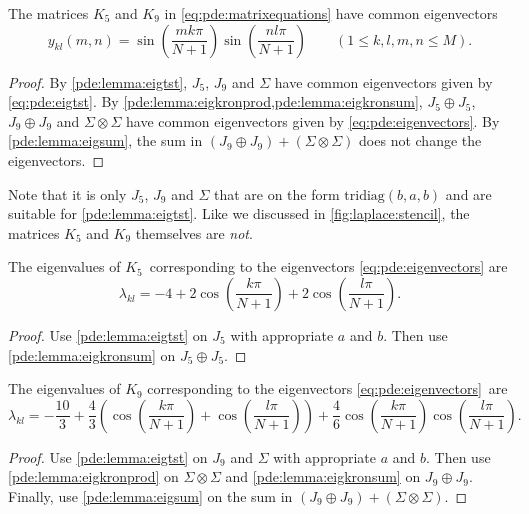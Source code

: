 \newcommand{\eigvecexpr}{\sin \left( \frac{mk\pi}{N+1} \right) \sin \left( \frac{nl\pi}{N+1} \right)}
\begin{theorem}
	The matrices $K_5$ and $K_9$ in \cref{eq:pde:matrixequations} have common eigenvectors
	\begin{equation}
		y_{kl}(m,n)= \eigvecexpr \qquad (1 \leq k,l,m,n \leq M).
		\label{eq:pde:eigenvectors}
	\end{equation}
\end{theorem}
\begin{proof}
	By \cref{pde:lemma:eigtst}, $J_5$, $J_9$ and $\Sigma$ have common eigenvectors given by \cref{eq:pde:eigtst}.
	By \cref{pde:lemma:eigkronprod,pde:lemma:eigkronsum}, $J_5 \oplus J_5$, $J_9 \oplus J_9$ and $\Sigma \otimes \Sigma$ have common eigenvectors given by \cref{eq:pde:eigenvectors}.
	By \cref{pde:lemma:eigsum}, the sum in $(J_9 \oplus J_9) + (\Sigma \otimes \Sigma)$ does not change the eigenvectors.
\end{proof}
Note that it is only $J_5$, $J_9$ and $\Sigma$ that are on the form $\text{tridiag}(b,a,b)$ and are suitable for \cref{pde:lemma:eigtst}.
Like we discussed in \cref{fig:laplace:stencil}, the matrices $K_5$ and $K_9$ themselves are \emph{not}.
\begin{theorem}
The eigenvalues of $K_5$ corresponding to the eigenvectors \ref{eq:pde:eigenvectors} are
\begin{equation}
	\lambda_{kl} = -4 + 2 \cos \left( \frac{k\pi}{N+1} \right) + 2 \cos \left( \frac{l\pi}{N+1} \right).
	\label{eq:pde:eigvals5}
\end{equation}
\end{theorem}
\begin{proof}
	Use \cref{pde:lemma:eigtst} on $J_5$ with appropriate $a$ and $b$.
	Then use \cref{pde:lemma:eigkronsum} on $J_5 \oplus J_5$.
\end{proof}
\begin{theorem}
The eigenvalues of $K_9$ corresponding to the eigenvectors \ref{eq:pde:eigenvectors} are
\begin{equation}
  \lambda_{kl} = -\frac{10}{3} + \frac43 \left( 
                   \cos\left(\frac{k \pi}{N+1}\right) + \cos\left(\frac{l \pi}{N+1}\right) 
               \right) + \frac46 \cos\left(\frac{k \pi}{N+1}\right) \cos\left(\frac{l \pi}{N+1}\right).
  \label{eq:pde:eigvals9}
\end{equation}
\end{theorem}
\begin{proof}
	Use \cref{pde:lemma:eigtst} on $J_9$ and $\Sigma$ with appropriate $a$ and $b$.
	Then use \cref{pde:lemma:eigkronprod} on $\Sigma \otimes \Sigma$ and \cref{pde:lemma:eigkronsum} on $J_9 \oplus J_9$.
	Finally, use \cref{pde:lemma:eigsum} on the sum in $(J_9 \oplus J_9) + (\Sigma \otimes \Sigma)$.
\end{proof}

